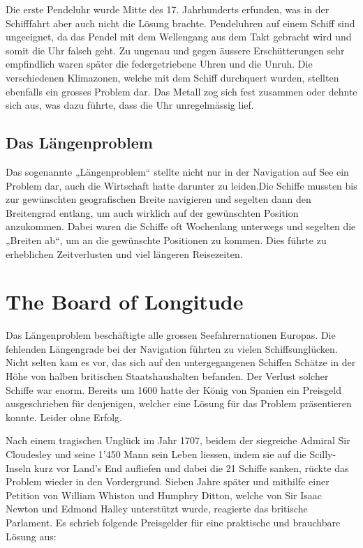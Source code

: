 \begin{refsection}
Die erste Pendeluhr wurde Mitte des 17. Jahrhunderts erfunden, was in der Schifffahrt aber auch nicht die Lösung brachte. Pendeluhren auf einem Schiff sind ungeeignet, da das Pendel mit dem Wellengang aus dem Takt gebracht wird und somit die Uhr falsch geht.
Zu ungenau und gegen äussere Erschütterungen sehr empfindlich waren später die federgetriebene Uhren und die Unruh. Die verschiedenen Klimazonen, welche mit dem Schiff durchquert wurden, stellten ebenfalls ein grosses Problem dar. Das Metall zog sich fest zusammen oder dehnte sich aus, was dazu führte, dass die Uhr unregelmässig lief.

\subsection{Das Längenproblem}
Das sogenannte „Längenproblem“ stellte nicht nur in der Navigation auf See ein Problem dar, auch die Wirtschaft hatte darunter zu leiden.Die Schiffe mussten bis zur gewünschten geografischen Breite navigieren und segelten dann den Breitengrad entlang, um auch wirklich auf der gewünschten Position anzukommen. Dabei waren die Schiffe oft Wochenlang unterwegs und segelten die „Breiten ab“, um an die gewünschte Positionen zu kommen. Dies führte zu erheblichen Zeitverlusten und viel längeren Reisezeiten.


\section{The Board of Longitude}
Das Längenproblem beschäftigte alle grossen Seefahrernationen Europas. Die fehlenden Längengrade bei der Navigation führten zu vielen Schiffsunglücken. Nicht selten kam es vor, das sich auf den untergegangenen Schiffen Schätze in der Höhe von halben britischen Staatshaushalten befanden. Der Verlust solcher Schiffe war enorm.
Bereits um 1600 hatte der König von Spanien ein Preisgeld ausgeschrieben für denjenigen, welcher eine Lösung für das Problem präsentieren konnte. Leider ohne Erfolg.

Nach einem tragischen Unglück im Jahr 1707, beidem der siegreiche Admiral Sir Cloudesley und seine 1’450 Mann sein Leben liessen, indem sie auf die Scilly-Inseln kurz vor Land’s End aufliefen und dabei die 21 Schiffe sanken, rückte das Problem wieder in den Vordergrund.
Sieben Jahre später und mithilfe einer Petition von William Whiston und Humphry Ditton, welche von Sir Isaac Newton und Edmond Halley unterstützt wurde, reagierte das britische Parlament.
Es schrieb folgende Preisgelder für eine praktische und brauchbare Lösung aus:


\end{refsection}
